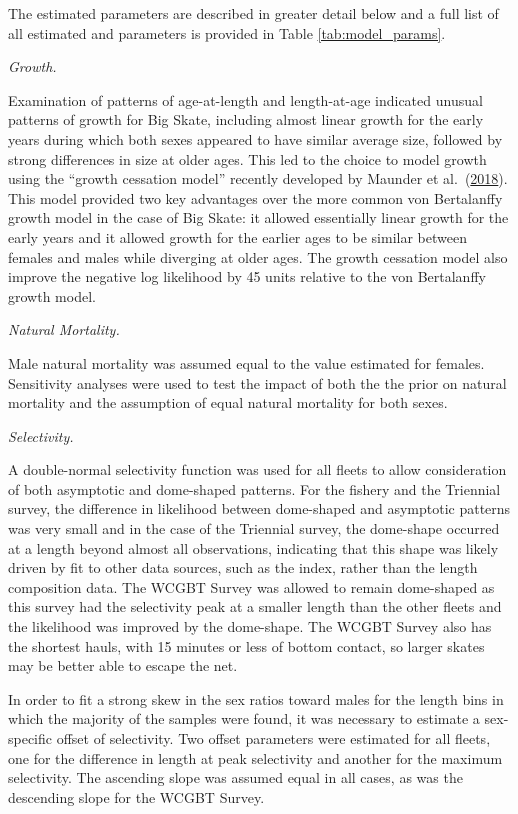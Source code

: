 \documentclass[12pt,]{article}
\begin{document}
The estimated parameters are described in greater detail below and a
full list of all estimated and parameters is provided in Table
\ref{tab:model_params}.

\emph{Growth.}

Examination of patterns of age-at-length and length-at-age indicated
unusual patterns of growth for Big Skate, including almost linear growth
for the early years during which both sexes appeared to have similar
average size, followed by strong differences in size at older ages. This
led to the choice to model growth using the ``growth cessation model''
recently developed by Maunder et
al.~(\protect\hyperlink{ref-maunder2018growth}{2018}). This model
provided two key advantages over the more common von Bertalanffy growth
model in the case of Big Skate: it allowed essentially linear growth for
the early years and it allowed growth for the earlier ages to be similar
between females and males while diverging at older ages. The growth
cessation model also improve the negative log likelihood by 45 units
relative to the von Bertalanffy growth model.

\emph{Natural Mortality.}

Male natural mortality was assumed equal to the value estimated for
females. Sensitivity analyses were used to test the impact of both the
the prior on natural mortality and the assumption of equal natural
mortality for both sexes.

\emph{Selectivity.}

A double-normal selectivity function was used for all fleets to allow
consideration of both asymptotic and dome-shaped patterns. For the
fishery and the Triennial survey, the difference in likelihood between
dome-shaped and asymptotic patterns was very small and in the case of
the Triennial survey, the dome-shape occurred at a length beyond almost
all observations, indicating that this shape was likely driven by fit to
other data sources, such as the index, rather than the length
composition data. The WCGBT Survey was allowed to remain dome-shaped as
this survey had the selectivity peak at a smaller length than the other
fleets and the likelihood was improved by the dome-shape. The WCGBT
Survey also has the shortest hauls, with 15 minutes or less of bottom
contact, so larger skates may be better able to escape the net.

In order to fit a strong skew in the sex ratios toward males for the
length bins in which the majority of the samples were found, it was
necessary to estimate a sex-specific offset of selectivity. Two offset
parameters were estimated for all fleets, one for the difference in
length at peak selectivity and another for the maximum selectivity. The
ascending slope was assumed equal in all cases, as was the descending
slope for the WCGBT Survey.
\end{document}
